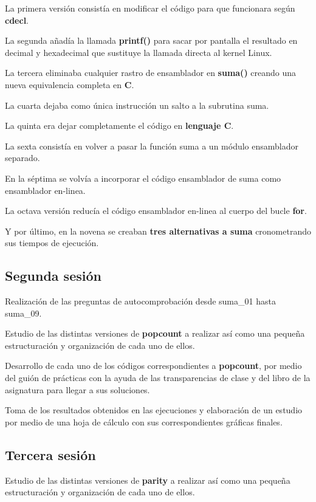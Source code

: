 La primera versión consistía en modificar el código para que funcionara
según \textbf{cdecl}.

La segunda añadía la llamada \textbf{printf()} para sacar por pantalla el 
resultado en decimal y hexadecimal que sustituye la llamada directa al kernel Linux.

La tercera eliminaba cualquier rastro de ensamblador en \textbf{suma()} creando una nueva equivalencia completa en \textbf{C}.

La cuarta dejaba como única instrucción un salto a la subrutina suma.

La quinta era dejar completamente el código en \textbf{lenguaje C}.

La sexta consistía en volver a pasar la función suma a un módulo ensamblador separado.

En la séptima se volvía a incorporar el código ensamblador de suma como ensamblador en-linea.

La octava versión reducía el código ensamblador en-linea al cuerpo del bucle \textbf{for}.

Y por último, en la novena se creaban \textbf{tres alternativas a suma} cronometrando sus tiempos de ejecución.

\subsection {Segunda sesión}
Realización de las preguntas de autocomprobación desde suma\_01 hasta suma\_09.

Estudio de las distintas versiones de \textbf{popcount} a realizar así
como una pequeña estructuración y organización de cada uno de ellos.

Desarrollo de cada uno de los códigos correspondientes a \textbf{popcount}, por medio
del guión de prácticas con la ayuda de las transparencias de clase y del libro de la asignatura
para llegar a sus soluciones.

Toma de los resultados obtenidos en las ejecuciones y elaboración de un estudio por 
medio de una hoja de cálculo con sus correspondientes gráficas finales.

\subsection {Tercera sesión}

Estudio de las distintas versiones de \textbf{parity} a realizar así
como una pequeña estructuración y organización de cada uno de ellos.

